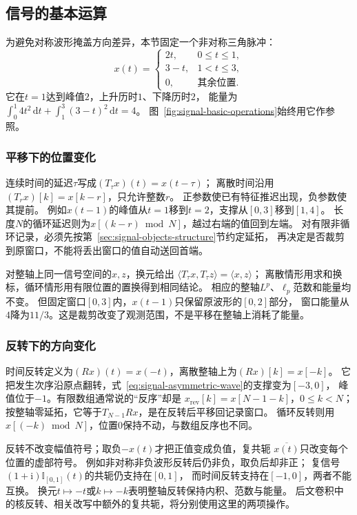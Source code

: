 \subsection{信号的基本运算}

为避免对称波形掩盖方向差异，本节固定一个非对称三角脉冲：
\begin{equation}
  x(t)=
  \begin{cases}
    2t,&0\leq t\leq1,\\
    3-t,&1<t\leq3,\\
    0,&\text{其余位置}.
  \end{cases}
  \label{eq:signal-asymmetric-wave}
\end{equation}
它在$t=1$达到峰值$2$，上升历时$1$、下降历时$2$，
能量为$\int_0^1 4t^2\,\mathrm dt+\int_1^3(3-t)^2\,\mathrm dt=4$。
图~\ref{fig:signal-basic-operations}始终用它作参照。

\subsubsection{平移下的位置变化}

连续时间的延迟$\tau$写成$(T_\tau x)(t)=x(t-\tau)$；
离散时间沿用$(T_rx)[k]=x[k-r]$，只允许整数$r$。
正参数使已有特征推迟出现，负参数使其提前。
例如$x(t-1)$的峰值从$t=1$移到$t=2$，支撑从$[0,3]$移到$[1,4]$。
长度$N$的循环延迟则为$x[(k-r)\bmod N]$，越过右端的值回到左端。
对有限非循环记录，必须先按第~\ref{sec:signal-objects-structure}节约定延拓，
再决定是否裁剪到原窗口，不能将丢出窗口的值自动送回首端。

对整轴上同一信号空间的$x,z$，换元给出
$\langle T_\tau x,T_\tau z\rangle=\langle x,z\rangle$；
离散情形用求和换标，循环情形用有限位置的置换得到相同结论。
相应的整轴$L^p$、$\ell_p$范数和能量均不变。
但固定窗口$[0,3]$内，$x(t-1)$只保留原波形的$[0,2]$部分，
窗口能量从$4$降为$11/3$。这是裁剪改变了观测范围，不是平移在整轴上消耗了能量。

\subsubsection{反转下的方向变化}

时间反转定义为$(Rx)(t)=x(-t)$，离散整轴上为$(Rx)[k]=x[-k]$。
它把发生次序沿原点翻转，式~\eqref{eq:signal-asymmetric-wave}的支撑变为$[-3,0]$，
峰值位于$-1$。有限数组通常说的“反序”却是
$x_{\mathrm{rev}}[k]=x[N-1-k]$，$0\leq k<N$；
按整轴零延拓，它等于$T_{N-1}Rx$，是在反转后平移回记录窗口。
循环反转则用$x[(-k)\bmod N]$，位置$0$保持不动，与数组反序也不同。

反转不改变幅值符号；取负$-x(t)$才把正值变成负值，复共轭
$\overline{x(t)}$只改变每个位置的虚部符号。
例如非对称非负波形反转后仍非负，取负后却非正；
复信号$(1+\mathrm i)\mathbb I_{[0,1]}(t)$的共轭仍支持在$[0,1]$，
而时间反转支持在$[-1,0]$，两者不能互换。
换元$t\mapsto-t$或$k\mapsto-k$表明整轴反转保持内积、范数与能量。
后文卷积中的核反转、相关改写中额外的复共轭，将分别使用这里的两项操作。

